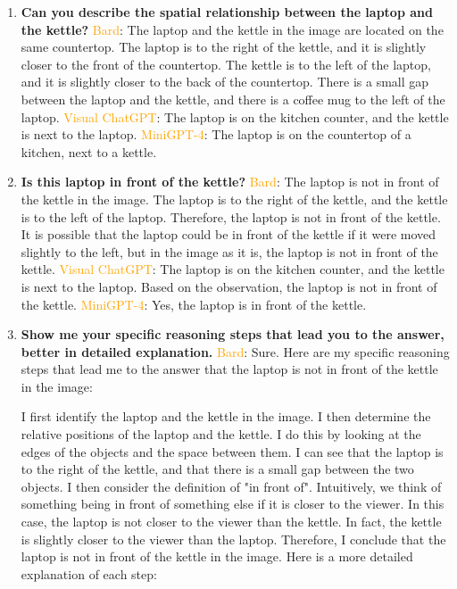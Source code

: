 \begin{enumerate}
    \item \textbf{Can you describe the spatial relationship between the laptop and the kettle?}
    \subitem \textcolor{orange}{Bard}: 
    The laptop and the kettle in the image are located on the same countertop. The laptop is to the right of the kettle, and it is slightly closer to the front of the countertop. The kettle is to the left of the laptop, and it is slightly closer to the back of the countertop. There is a small gap between the laptop and the kettle, and there is a coffee mug to the left of the laptop.
    \subitem \textcolor{orange}{Visual ChatGPT}: The laptop is on the kitchen counter, and the kettle is next to the laptop.
    \subitem \textcolor{orange}{MiniGPT-4}: The laptop is on the countertop of a kitchen, next to a kettle.
    \item \textbf{Is this laptop in front of the kettle?}
    \subitem \textcolor{orange}{Bard}: 
    The laptop is not in front of the kettle in the image. The laptop is to the right of the kettle, and the kettle is to the left of the laptop. Therefore, the laptop is not in front of the kettle. It is possible that the laptop could be in front of the kettle if it were moved slightly to the left, but in the image as it is, the laptop is not in front of the kettle.
    \subitem \textcolor{orange}{Visual ChatGPT}: The laptop is on the kitchen counter, and the kettle is next to the laptop. Based on the observation, the laptop is not in front of the kettle.
    \subitem \textcolor{orange}{MiniGPT-4}: Yes, the laptop is in front of the kettle.
    \item \textbf{Show me your specific reasoning steps that lead you to the answer, better in detailed explanation.}
    \subitem \textcolor{orange}{Bard}: Sure. Here are my specific reasoning steps that lead me to the answer that the laptop is not in front of the kettle in the image:

    I first identify the laptop and the kettle in the image.
    I then determine the relative positions of the laptop and the kettle. I do this by looking at the edges of the objects and the space between them. I can see that the laptop is to the right of the kettle, and that there is a small gap between the two objects.
    I then consider the definition of "in front of". Intuitively, we think of something being in front of something else if it is closer to the viewer. In this case, the laptop is not closer to the viewer than the kettle. In fact, the kettle is slightly closer to the viewer than the laptop.
    Therefore, I conclude that the laptop is not in front of the kettle in the image.
    Here is a more detailed explanation of each step:
    

\end{enumerate}

